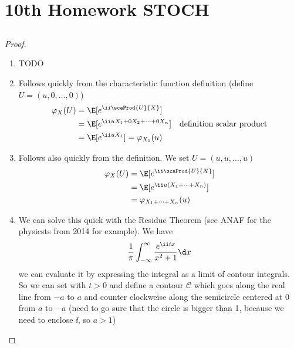 
\section{10th Homework STOCH}
\subsection{}
\begin{proof}
	\begin{enumerate}
		\item TODO
		\item Follows quickly from the characteristic function definition (define $U= (u,0,\dots,0)$)
		\begin{align*}
			\varphi_X(U) &= \E[e^{\ii \scaProd{U}{X}}]\\
			&= \E[e^{\ii uX_1 + 0X_2 + \cdots + 0X_n}] \quad \text{definition scalar product}\\
			&= \E[e^{\ii uX_1}] = \varphi_{X_1}(u)
		\end{align*}
		\item Follows also quickly from the definition. We set $U = (u,u, \dots, u)$
		\begin{align*}
			\varphi_X(U) &= \E[e^{\ii \scaProd{U}{X}}]\\
			&= \E[e^{\ii u (X_1 + \cdots + X_n)}]\\
			&= \varphi_{X_1+\cdots+X_n}(u)
		\end{align*}
		\item We can solve this quick with the Residue Theorem (see ANAF for the physicsts from 2014 for example). We have
		\begin{align*}
		\frac{1}{\pi}\int_{-\infty}^{\infty} \frac{e^{\ii t x}}{x^2+1} \d x
		\end{align*}
		we can evaluate it by expressing the integral as a limit of contour integrals. So we can set with $t>0$ and define a contour $\mathscr{C}$ which goes along the real line from $-a$ to $a$ and counter clockweise along the semicircle centered at 0 from $a$ to $-a$ (need to go sure that the circle is bigger than 1, because we need to enclose $\ii$, so $a > 1$)

\end{enumerate}
\end{proof}
